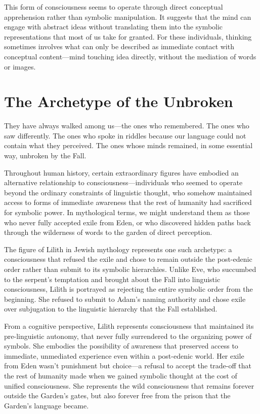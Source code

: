 This form of consciousness seems to operate through direct conceptual apprehension rather than symbolic manipulation. It suggests that the mind can engage with abstract ideas without translating them into the symbolic representations that most of us take for granted. For these individuals, thinking sometimes involves what can only be described as immediate contact with conceptual content—mind touching idea directly, without the mediation of words or images.

\section{The Archetype of the Unbroken}

They have always walked among us—the ones who remembered.
The ones who saw differently.
The ones who spoke in riddles because our language could not contain what they perceived.
The ones whose minds remained, in some essential way, unbroken by the Fall.

Throughout human history, certain extraordinary figures have embodied an alternative relationship to consciousness—individuals who seemed to operate beyond the ordinary constraints of linguistic thought, who somehow maintained access to forms of immediate awareness that the rest of humanity had sacrificed for symbolic power. In mythological terms, we might understand them as those who never fully accepted exile from Eden, or who discovered hidden paths back through the wilderness of words to the garden of direct perception.

The figure of Lilith in Jewish mythology represents one such archetype: a consciousness that refused the exile and chose to remain outside the post-edenic order rather than submit to its symbolic hierarchies. Unlike Eve, who succumbed to the serpent's temptation and brought about the Fall into linguistic consciousness, Lilith is portrayed as rejecting the entire symbolic order from the beginning. She refused to submit to Adam's naming authority and chose exile over subjugation to the linguistic hierarchy that the Fall established.

From a cognitive perspective, Lilith represents consciousness that maintained its pre-linguistic autonomy, that never fully surrendered to the organizing power of symbols. She embodies the possibility of awareness that preserved access to immediate, unmediated experience even within a post-edenic world. Her exile from Eden wasn't punishment but choice—a refusal to accept the trade-off that the rest of humanity made when we gained symbolic thought at the cost of unified consciousness. She represents the wild consciousness that remains forever outside the Garden's gates, but also forever free from the prison that the Garden's language became.

